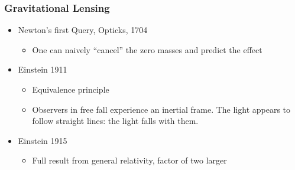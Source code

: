 \documentclass{beamer}
\begin{document}
\frame
{
    \frametitle{Gravitational Lensing}

 
    \begin{itemize}

        \item Newton's first Query, Opticks, 1704
            \begin{itemize}
                \item One can naively ``cancel'' the zero masses and predict
                    the effect
            \end{itemize}

        \item Einstein 1911
            \begin{itemize}

                \item Equivalence principle

                \item Observers in free fall experience an inertial frame.  The
                    light appears to follow straight lines: the light falls
                    with them.

            \end{itemize}

        \item Einstein 1915
            \begin{itemize}
                \item Full result from general relativity, factor of two larger
            \end{itemize}


    \end{itemize}

}


	
\end{document}
